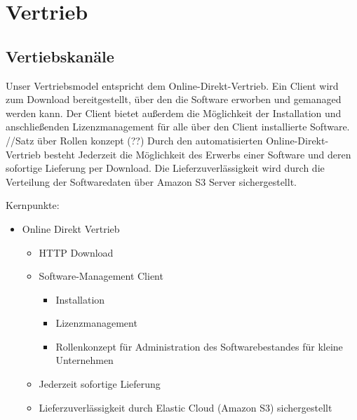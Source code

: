 \chapter{Vertrieb}
	\section{Vertiebskan\"ale}
	
Unser Vertriebsmodel entspricht dem Online-Direkt-Vertrieb. Ein Client wird zum Download bereitgestellt, über den die  Software erworben und gemanaged werden kann.
Der Client bietet außerdem die Möglichkeit der Installation und anschließenden Lizenzmanagement für alle über den Client installierte Software.
//Satz über Rollen konzept (??)
Durch den automatisierten Online-Direkt-Vertrieb besteht Jederzeit die Möglichkeit des Erwerbs einer Software und deren sofortige Lieferung per Download.
Die Lieferzuverlässigkeit wird durch die Verteilung der Softwaredaten über Amazon S3 Server sichergestellt.

	
	Kernpunkte:\\
	\begin{itemize}
		\item Online Direkt Vertrieb
		\begin{itemize}
			\item HTTP Download
			\item Software-Management Client
				\begin{itemize}
					\item Installation
					\item Lizenzmanagement
					\item Rollenkonzept f\"ur Administration des Softwarebestandes f\"ur kleine Unternehmen
				\end{itemize}
			\item Jederzeit sofortige Lieferung
			\item Lieferzuverlässigkeit durch Elastic Cloud (Amazon S3) sichergestellt
		\end{itemize}
	\end{itemize}

